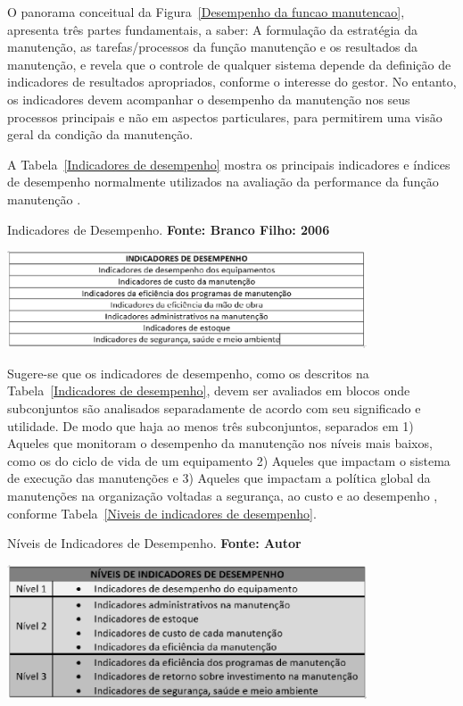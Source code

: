 O panorama conceitual da Figura~\ref{Desempenho da funcao manutencao}, apresenta três partes fundamentais, a saber: A formulação da estratégia da manutenção, as tarefas/processos da função manutenção e os resultados da manutenção, e revela que o controle de qualquer sistema depende da definição de indicadores de resultados apropriados, conforme o interesse do gestor. No entanto, os indicadores devem acompanhar o desempenho da manutenção nos seus processos principais e não em aspectos particulares, para permitirem uma visão geral da condição da manutenção.

A Tabela~\ref{Indicadores de desempenho} mostra os principais indicadores e índices de desempenho normalmente utilizados na avaliação da performance da função manutenção \cite{branco2006indicadores}.

\graphicspath{{figuras/}}	
\begin{table}[H]
\centering
\caption{Indicadores de Desempenho. \textbf{Fonte: Branco Filho: 2006}}
\includegraphics[width=0.8\textwidth]{IndicadoresBrancoFilho.eps}
\label{Indicadores de desempenho}
\end{table}

Sugere-se que os indicadores de desempenho, como os descritos na Tabela~\ref{Indicadores de desempenho}, devem ser avaliados em blocos onde subconjuntos são analisados separadamente de acordo com seu significado e utilidade. De modo que haja ao menos três subconjuntos, separados em 1) Aqueles que monitoram o desempenho da manutenção nos níveis mais baixos, como os do ciclo de vida de um equipamento 2) Aqueles que impactam o sistema de execução das manutenções e 3) Aqueles que impactam a política global da manutenções na organização voltadas a segurança, ao custo e ao desempenho \cite{de2012indicadores}, conforme Tabela~\ref{Niveis de indicadores de desempenho}.

\graphicspath{{figuras/}}
\begin{table}[H]
\centering
\caption{Níveis de Indicadores de Desempenho. \textbf{Fonte: Autor}}
\includegraphics[width=0.8\textwidth]{niveisdeindicadores.eps}
\label{Niveis de indicadores de desempenho}
\end{table}

